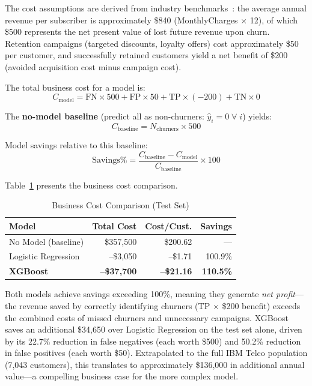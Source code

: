 \documentclass[10pt, conference, letterpaper]{IEEEtran}
\begin{document}
The cost assumptions are derived from industry benchmarks~\cite{ahmad2019churn}: the average annual revenue per subscriber is approximately \$840 (MonthlyCharges $\times$ 12), of which \$500 represents the net present value of lost future revenue upon churn. Retention campaigns (targeted discounts, loyalty offers) cost approximately \$50 per customer, and successfully retained customers yield a net benefit of \$200 (avoided acquisition cost minus campaign cost).

The total business cost for a model is:
\begin{equation}
C_{\text{model}} = \text{FN} \times 500 + \text{FP} \times 50 + \text{TP} \times (-200) + \text{TN} \times 0
\label{eq:total_cost}
\end{equation}

The \textbf{no-model baseline} (predict all as non-churners: $\hat{y}_i{=}0\;\forall\;i$) yields:
\begin{equation}
C_{\text{baseline}} = N_{\text{churners}} \times 500
\label{eq:baseline_cost}
\end{equation}

Model savings relative to this baseline:
\begin{equation}
\text{Savings\%} = \frac{C_{\text{baseline}} - C_{\text{model}}}{C_{\text{baseline}}} \times 100
\label{eq:savings}
\end{equation}

Table~\ref{tab:cost_results} presents the business cost comparison.

\begin{table}[htbp]
\caption{Business Cost Comparison (Test Set)}
\label{tab:cost_results}
\begin{center}
\begin{tabular}{@{}lrrr@{}}
\toprule
\textbf{Model} & \textbf{Total Cost} & \textbf{Cost/Cust.} & \textbf{Savings} \\
\midrule
No Model (baseline) & \$357,500 & \$200.62 & --- \\
Logistic Regression & --\$3,050 & --\$1.71  & 100.9\% \\
\textbf{XGBoost}    & \textbf{--\$37,700} & \textbf{--\$21.16} & \textbf{110.5\%} \\
\bottomrule
\end{tabular}
\end{center}
\end{table}

Both models achieve savings exceeding 100\%, meaning they generate \textit{net profit}---the revenue saved by correctly identifying churners (TP $\times$ \$200 benefit) exceeds the combined costs of missed churners and unnecessary campaigns. XGBoost saves an additional \$34,650 over Logistic Regression on the test set alone, driven by its 22.7\% reduction in false negatives (each worth \$500) and 50.2\% reduction in false positives (each worth \$50). Extrapolated to the full IBM Telco population (7,043 customers), this translates to approximately \$136,000 in additional annual value---a compelling business case for the more complex model.
\end{document}
